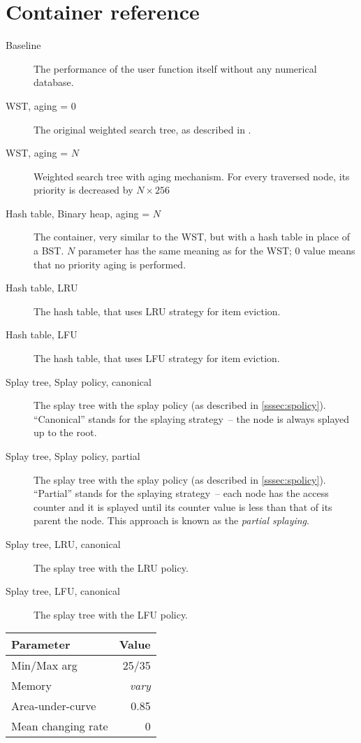 \section{Container reference}
\begin{description}
\item[Baseline] The performance of the user function itself without any numerical database.
\item[WST, aging = 0] The original weighted search tree, as described in \cite{park94}.
\item[WST, aging = $N$] Weighted search tree with aging mechanism. For every traversed node, its priority is decreased by $N \times 256$
\item[Hash table, Binary heap, aging = $N$] The container, very similar to the WST, but with a hash table in place of a BST. $N$ parameter has the same meaning as for the WST; 0 value means that no priority aging is performed.
\item[Hash table, LRU] The hash table, that uses LRU strategy for item eviction.
\item[Hash table, LFU] The hash table, that uses LFU strategy for item eviction.

\item[Splay tree, Splay policy, canonical] The splay tree with the splay policy (as described in \cref{sssec:spolicy}). ``Canonical'' stands for the splaying strategy~-- the node is always splayed up to the root\cite{splay_tree}.
\item[Splay tree, Splay policy, partial] The splay tree with the splay policy (as described in \cref{sssec:spolicy}). ``Partial'' stands for the splaying strategy~-- each node has the access counter and it is splayed until its counter value is less than that of its parent the node. This approach is known as the \emph{partial splaying}\cite{partial_splaying}.
\item[Splay tree, LRU, canonical] The splay tree with the LRU policy.
\item[Splay tree, LFU, canonical] The splay tree with the LFU policy.
\end{description}
\pagebreak

\begin{tabular}[h]{l r} \toprule
Parameter & Value \\ \midrule
Min/Max arg & 25/35 \\
Memory & \emph{vary} \\
Area-under-curve & 0.85 \\
Mean changing rate & 0 \\ \bottomrule
\end{tabular}

